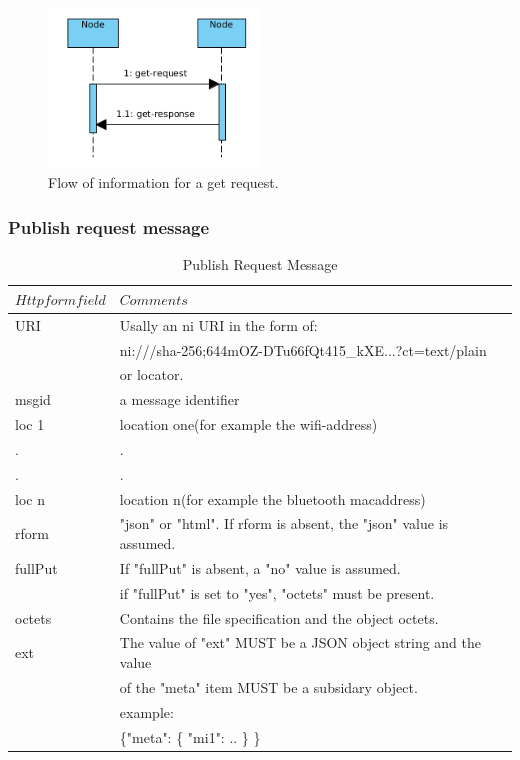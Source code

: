 \documentclass[11pt]{article}
\begin{document}
\begin{figure}[H]
\centering
\includegraphics[width=0.5\textwidth]{seq_get.png}
\caption{Flow of information for a get request.}
\label{fig:sequence_get}
\end{figure}

\subsubsection{Publish request message}
\begin{table}[h]
\begin{tabular}{|l|l|}
\hline
$ Http form field$&$Comments$\\

\hline

URI&Usally an ni URI in the form of:\\
 &ni:///sha-256;644mOZ-DTu66fQt415\_kXE...?ct=text/plain\\
 &or locator.\\
\hline
msgid&a message identifier\\
\hline
loc 1&location one(for example the wifi-address)\\
\hline
.&.\\
\hline
.&.\\
\hline
loc n&location n(for example the bluetooth macaddress)\\
\hline
rform&"json" or "html". If rform is absent, the "json" value is assumed.\\
\hline
fullPut&If "fullPut" is absent, a "no" value is assumed.\\
 &if "fullPut" is set to "yes", "octets" must be present.\\
\hline
octets&Contains the file specification and the object octets.\\
\hline
ext&The value of "ext" MUST be a JSON object string and the value\\
 &of the "meta" item MUST be a subsidary object.\\
  &example:\\
  & \{"meta": \{ "mi1": .. \} \}\\
\hline
\end{tabular}
\caption{Publish Request Message}
\label{table:tab1}
\end{table}
\end{document}
